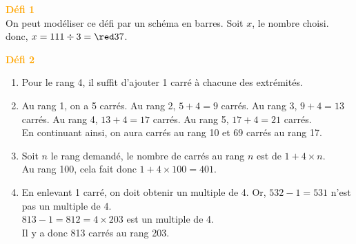 \addtocounter{exercice}{-1}
\begin{corrige}
    \phantom{rrr}

    \hspace*{-7.5mm} \textcolor{orange}{\bf Défi 1} \\
       On peut modéliser ce défi par un schéma en barres. Soit $x$, le nombre choisi. \\
        donc, $x =111\div3 ={\red 37}$.
    
    \hspace*{-7.5mm} \textcolor{orange}{\bf Défi 2} \\
       \begin{enumerate}
          \item Pour le rang 4, il suffit {\red d'ajouter 1 carré à chacune des extrémités}.
          \item Au rang 1, on a 5 carrés. Au rang 2, $5+4 =9$ carrés. Au rang 3, $9+4 =13$ carrés.  Au rang 4, $13+4 =17$ carrés. {\red Au rang 5, $17+4 =21$ carrés}. \\
             En continuant ainsi, on aura { carrés au rang 10 et 69 carrés au rang 17}.
             \item Soit $n$ le rang demandé, {\red le nombre de carrés au rang $n$ est de $1+4\times n$}. \\
                Au rang 100, cela fait donc $1+4\times100 =401$.
             \item En enlevant 1 carré, on doit obtenir un multiple de 4. Or, $532-1 =531$ n'est pas un multiple de 4. \\
                $813-1 =812 =4\times203$ est un multiple de 4. \\
                {\red Il y a donc 813 carrés au rang 203}.     
       \end{enumerate}
    \end{corrige}